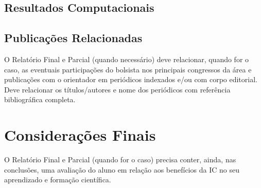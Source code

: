 \documentclass[a4paper,12pt]{report}
\theoremstyle{plain}
\theoremstyle{definition}
\begin{document}
	\section{Resultados Computacionais}
	
	\section{Publicações Relacionadas}
	O Relatório Final e Parcial (quando necessário) deve relacionar, quando for o caso, as eventuais participações do bolsista nos principais congressos da área e publicações com o orientador em periódicos indexados e/ou com corpo editorial. Deve relacionar os títulos/autores e nome dos periódicos com referência bibliográfica completa.
	
	\chapter{Considerações Finais}
	
	O Relatório Final e Parcial (quando for o caso) precisa conter, ainda, nas conclusões, uma avaliação do aluno em relação aos benefícios da IC no seu aprendizado e formação científica.
	
	
	
	
	
	
	\newpage
	\appendix
		
	
	
	
\end{document}
